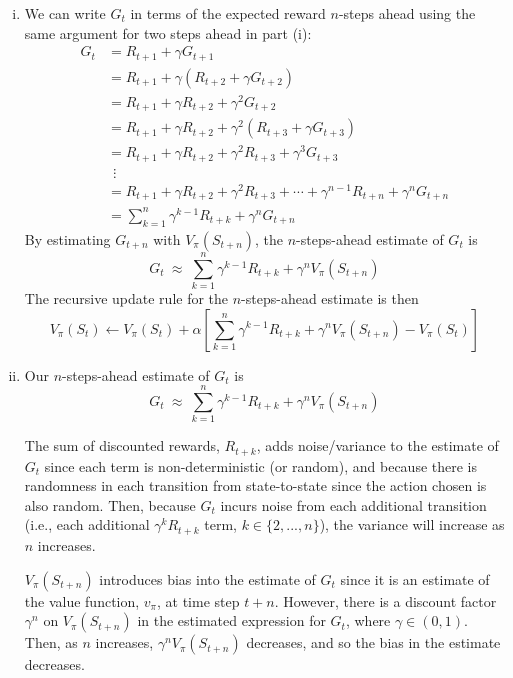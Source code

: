 \documentclass[twoside,11pt]{homework}
\DeclarePairedDelimiter{\2norm}{\lVert}{\rVert^2_2}
\newcommand{\1}[1]{\mathds{1}\left[#1\right]}
\begin{document}
\begin{enumerate}[i)]
\item We can write $G_t$ in terms of the expected reward $n$-steps ahead using the same argument for two steps ahead in part (i):
\begin{align*}
G_t & = R_{t+1}  + \gamma G_{t+1}\\
& = R_{t+1}  + \gamma(R_{t+2}  + \gamma G_{t+2})\\
& = R_{t+1}  + \gamma R_{t+2}  + \gamma^2 G_{t+2}\\
& = R_{t+1}  + \gamma R_{t+2}  + \gamma^2 (R_{t+3}  + \gamma G_{t+3})\\
& = R_{t+1}  + \gamma R_{t+2}  + \gamma^2 R_{t+3}  + \gamma^3 G_{t+3}\\
& \ \  \vdots \\
& = R_{t+1}  + \gamma R_{t+2}  + \gamma^2 R_{t+3}  + \cdots + \gamma^{n-1} R_{t+n} + \gamma^n G_{t+n}\\
& = \sum_{k=1}^{n}\gamma^{k-1} R_{t+k} + \gamma^n G_{t+n} 
\end{align*}
By estimating $G_{t+n}$ with $V_{\pi}(S_{t+n})$, the $n$-steps-ahead estimate of $G_t$ is 
$$G_t \ \approx \ \sum_{k=1}^{n}\gamma^{k-1} R_{t+k} + \gamma^n V_{\pi}(S_{t+n})$$
The recursive update rule for the $n$-steps-ahead estimate is then
$$V_{\pi}(S_t) \longleftarrow V_{\pi}(S_t) + \alpha\left[\sum_{k=1}^{n}\gamma^{k-1} R_{t+k}  + \gamma^n V_{\pi}(S_{t+n}) - V_{\pi}(S_t)\right]$$

\item Our $n$-steps-ahead estimate of $G_t$ is 
$$G_t \ \approx \ \sum_{k=1}^{n}\gamma^{k-1} R_{t+k} + \gamma^n V_{\pi}(S_{t+n})$$

The sum of discounted rewards, $R_{t+k}$,  adds noise/variance to the estimate of $G_t$ since each term is non-deterministic (or random), and because there is randomness in each transition from state-to-state since the action chosen is also random. 
Then, because $G_t$ incurs noise from each additional transition (i.e., each additional $\gamma^kR_{t+k}$ term, $k \in \{2, ..., n\}$), the variance will increase as $n$ increases.

$V_{\pi}(S_{t+n})$ introduces bias into the estimate of $G_t$ since it is an estimate of the value function, $v_{\pi}$, at time step $t+n$. However, there is a discount factor $\gamma^n$ on $V_{\pi}(S_{t+n})$ in the estimated expression for $G_t$, where $\gamma \in (0, 1)$. Then, as $n$ increases, $\gamma^nV_{\pi}(S_{t+n})$ decreases, and so the bias in the estimate decreases.


\end{enumerate}
\end{document}
